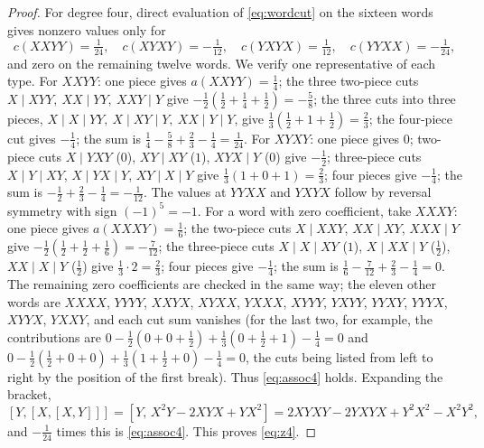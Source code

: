 \begin{proof}
For degree four, direct evaluation of \eqref{eq:wordcut} on the sixteen
words gives nonzero values only for
\[
 c(XXYY)=\tfrac1{24},\quad c(XYXY)=-\tfrac1{12},\quad
 c(YXYX)=\tfrac1{12},\quad c(YYXX)=-\tfrac1{24},
\]
and zero on the remaining twelve words. We verify one representative of
each type. For $XXYY$: one piece gives $a(XXYY)=\tfrac14$; the three
two-piece cuts $X\mid XYY,\ XX\mid YY,\ XXY\mid Y$ give
$-\tfrac12(\tfrac12+\tfrac14+\tfrac12)=-\tfrac58$; the three cuts into three pieces,
$X\mid X\mid YY,\ X\mid XY\mid Y,\ XX\mid Y\mid Y$, give
$\tfrac13(\tfrac12+1+\tfrac12)=\tfrac23$; the four-piece cut gives
$-\tfrac14$; the sum is $\tfrac14-\tfrac58+\tfrac23-\tfrac14=\tfrac1{24}$.
For $XYXY$: one piece gives $0$; two-piece cuts $X\mid YXY$ ($0$),
$XY\mid XY$ ($1$), $XYX\mid Y$ ($0$) give $-\tfrac12$; three-piece cuts
$X\mid Y\mid XY$, $X\mid YX\mid Y$, $XY\mid X\mid Y$ give
$\tfrac13(1+0+1)=\tfrac23$; four pieces give $-\tfrac14$; the sum is
$-\tfrac12+\tfrac23-\tfrac14=-\tfrac1{12}$. The values at $YYXX$ and $YXYX$
follow by reversal symmetry with sign $(-1)^5=-1$. For a word with zero
coefficient, take $XXXY$: one piece gives $a(XXXY)=\tfrac16$; the two-piece
cuts $X\mid XXY$, $XX\mid XY$, $XXX\mid Y$ give
$-\tfrac12(\tfrac12+\tfrac12+\tfrac16)=-\tfrac7{12}$; the three-piece cuts
$X\mid X\mid XY$ ($1$), $X\mid XX\mid Y$ ($\tfrac12$), $XX\mid X\mid Y$
($\tfrac12$) give $\tfrac13\cdot2=\tfrac23$; four pieces give $-\tfrac14$;
the sum is $\tfrac16-\tfrac7{12}+\tfrac23-\tfrac14=0$. The
remaining zero coefficients are checked in the same way; the eleven other
words are $XXXX$, $YYYY$, $XXYX$, $XYXX$, $YXXX$, $XYYY$, $YXYY$, $YYXY$,
$YYYX$, $XYYX$, $YXXY$, and each cut sum vanishes (for the last two, for
example, the contributions are $0-\tfrac12(0+0+\tfrac12)+\tfrac13(0+\tfrac12+1)
-\tfrac14=0$ and $0-\tfrac12(\tfrac12+0+0)+\tfrac13(1+\tfrac12+0)-\tfrac14=0$,
the cuts being listed from left to right by the position of the first break).
Thus \eqref{eq:assoc4} holds. Expanding the bracket,
\[
 [Y,[X,[X,Y]]]=[Y,\,X^2Y-2XYX+YX^2]
 =2XYXY-2YXYX+Y^2X^2-X^2Y^2,
\]
and $-\tfrac1{24}$ times this is \eqref{eq:assoc4}. This proves
\eqref{eq:z4}.


\end{proof}
